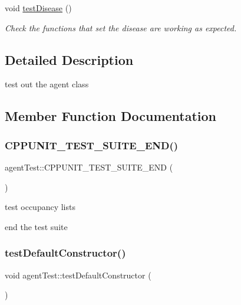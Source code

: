 \begin{DoxyCompactItemize}
\mbox{\label{classagentTest_a628c4b06eee5b0e6e7a45c842ed70429}} 
void \mbox{\hyperlink{classagentTest_a628c4b06eee5b0e6e7a45c842ed70429}{test\+Disease}} ()
\begin{DoxyCompactList}\small\item\em Check the functions that set the disease are working as expected. \end{DoxyCompactList}\end{DoxyCompactItemize}


\subsection{Detailed Description}
test out the agent class 

\subsection{Member Function Documentation}
\mbox{\label{classagentTest_a51ff7b623cb89bce6fa8bab5f8af04b7}} 
\subsubsection{\texorpdfstring{C\+P\+P\+U\+N\+I\+T\+\_\+\+T\+E\+S\+T\+\_\+\+S\+U\+I\+T\+E\+\_\+\+E\+N\+D()}{CPPUNIT\_TEST\_SUITE\_END()}}
{\footnotesize\ttfamily agent\+Test\+::\+C\+P\+P\+U\+N\+I\+T\+\_\+\+T\+E\+S\+T\+\_\+\+S\+U\+I\+T\+E\+\_\+\+E\+ND (\begin{DoxyParamCaption}{ }\end{DoxyParamCaption})}



test occupancy lists 

end the test suite \mbox{\label{classagentTest_ade6fc2895d439529b21d4fb725302b77}} 
\subsubsection{\texorpdfstring{test\+Default\+Constructor()}{testDefaultConstructor()}}
{\footnotesize\ttfamily void agent\+Test\+::test\+Default\+Constructor (\begin{DoxyParamCaption}{ }\end{DoxyParamCaption})\hspace{0.3cm}{\ttfamily [inline]}}



